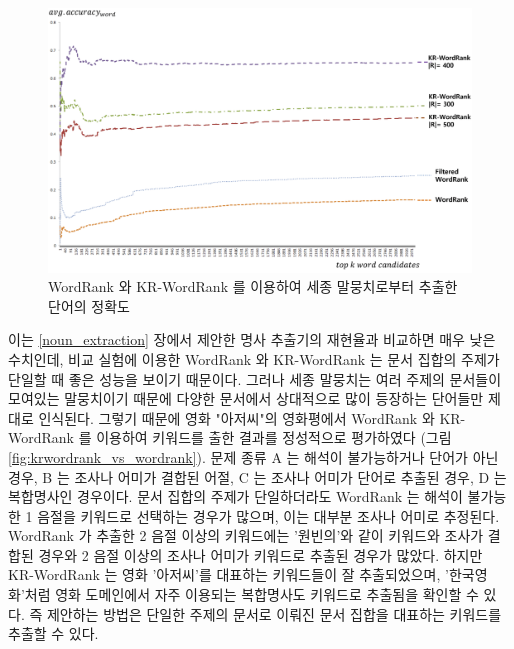 \documentclass[oneside, ko,phd]{snuthesis_utf8_kor}
\begin{document}
\begin{figure}[H]
\centering
\includegraphics[keepaspectratio=true, width=0.9\linewidth]{fig/krwordrank_performance.png}
\caption{WordRank 와 KR-WordRank 를 이용하여 세종 말뭉치로부터 추출한 단어의 정확도}
\label{fig:krwordrank_performance}
\end{figure}

이는 \ref{noun_extraction} 장에서 제안한 명사 추출기의 재현율과 비교하면 매우 낮은 수치인데, 비교 실험에 이용한 WordRank 와 KR-WordRank 는 문서 집합의 주제가 단일할 때 좋은 성능을 보이기 때문이다.
그러나 세종 말뭉치는 여러 주제의 문서들이 모여있는 말뭉치이기 때문에 다양한 문서에서 상대적으로 많이 등장하는 단어들만 제대로 인식된다.
그렇기 때문에 영화 "아저씨"의 영화평에서 WordRank 와 KR-WordRank 를 이용하여 키워드를 출한 결과를 정성적으로 평가하였다 (그림 \ref{fig:krwordrank_vs_wordrank}).
문제 종류 A 는 해석이 불가능하거나 단어가 아닌 경우, B 는 조사나 어미가 결합된 어절, C 는 조사나 어미가 단어로 추출된 경우, D 는 복합명사인 경우이다.
문서 집합의 주제가 단일하더라도 WordRank 는 해석이 불가능한 1 음절을 키워드로 선택하는 경우가 많으며, 이는 대부분 조사나 어미로 추정된다.
WordRank 가 추출한 2 음절 이상의 키워드에는 '원빈의'와 같이 키워드와 조사가 결합된 경우와 2 음절 이상의 조사나 어미가 키워드로 추출된 경우가 많았다.
하지만 KR-WordRank 는 영화 '아저씨'를 대표하는 키워드들이 잘 추출되었으며, '한국영화'처럼 영화 도메인에서 자주 이용되는 복합명사도 키워드로 추출됨을 확인할 수 있다.
즉 제안하는 방법은 단일한 주제의 문서로 이뤄진 문서 집합을 대표하는 키워드를 추출할 수 있다.
\end{document}
